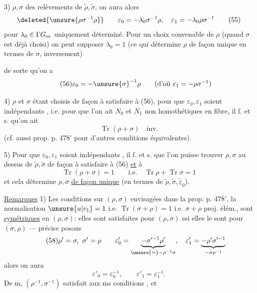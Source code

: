 3)  $\rho,\sigma$ des relèvements de
$\widetilde\rho,\widetilde\sigma$, on aura alors
\[
  \deleted{\unsure{\rho\sigma^{-1}\rho}}\qquad
  \varepsilon_0=-\lambda_0\sigma^{-1}\rho,\quad
  \varepsilon_1=-\lambda_0\rho\sigma^{-1} \tag{55}
\]
pour $\lambda_0\in\Gamma\mathbb \mathbb G_m$ uniquement déterminé.
Pour un choix convenable de $\rho$ (quand $\sigma$ est déjà choisi)
on peut supposer $\lambda_0=1$
(ce qui détermine $\rho$ de façon unique en
 termes de $\sigma$,  inversement)



 de sorte qu'on a
\[
\tag{56}
\varepsilon_0=-\unsure{\sigma}^{-1}\rho
\qquad(\text{d'où }\varepsilon_1=-\rho\sigma^{-1})
\]

4) $\rho$ et $\sigma$ étant choisis de façon à satisfaire à (56), pour que $\varepsilon_0,\varepsilon_1$ soient  indépendants , i.e. pour que l'on ait $N_0$ et $N_1$ non homothétiques en  fibre, il f. et s. qu'on ait
\[
\tag{57}
\operatorname{Tr}(\rho+\sigma)\quad\text{inv.}
\]
(cf. aussi prop. p. 478' pour d'autres conditions équivalentes).

5) Pour que $\varepsilon_0,\varepsilon_1$ soient indépendants , il f. et s. que l'on  puisse trouver  $\rho,\sigma$ au dessus de $\widetilde\rho,\widetilde\sigma$ de façon à satisfaire à (56) \uline{et} à
\[
\tag{57'}
\operatorname{Tr}(\rho+\sigma)=1
\qquad\text{i.e.}\quad
\operatorname{Tr}\rho+\operatorname{Tr}\sigma=1
\]
et cela détermine $\rho,\sigma$ \uline{de façon unique} (en termes de $\widetilde\rho,\widetilde\sigma,\underline{\widetilde\varepsilon}_0$).

\uline{Remarques} 1) Les conditions sur $(\rho,\sigma)$ envisagées dans la prop. p. 478',  la normalisation $\unsure{u|v_1}=1$ i.e. $\operatorname{Tr}(\sigma+\rho)=1$ i.e. $\sigma+\rho$ proj. élém., sont \uline{symétriques} en $(\rho,\sigma)$: elles sont satisfaites pour $(\rho,\sigma)$ ssi elles le sont pour $(\sigma,\rho)$ ---   précise posons
\[
\tag{58}
\rho'=\sigma,\ \sigma'=\rho\qquad
\varepsilon'_0=\underbrace{-\sigma'^{-1}\rho'}_{\unsure{=}-\rho^{-1}\sigma},\quad
\varepsilon'_1=\underbrace{-\rho'\sigma'^{-1}}_{-\sigma\rho^{-1}}
\]
alors on aura
\[
\tag{59}
\varepsilon'_0=\varepsilon_0^{-1},\qquad
\varepsilon'_1=\varepsilon_1^{-1}.
\]
De $\overline{\mathrm m}$, $(\rho^{-1},\sigma^{-1})$ satisfait aux $\overline{\mathrm m}$s conditions , et 

